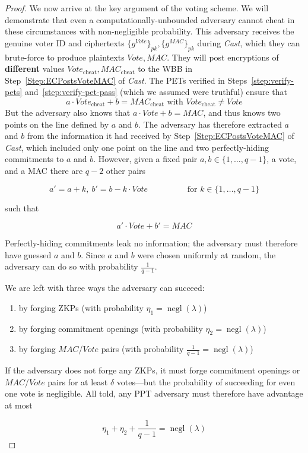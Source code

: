 \documentclass[12pt,a4paper]{article}
\DeclareMathOperator{\negl}{\text{negl}}
\theoremstyle{definition}
\newcommand{\Vote}{\mathit{Vote}}
\newcommand{\Mac}{\mathit{MAC}}
\begin{document}
\begin{proof}
    We now arrive at the key argument of the voting scheme. We will demonstrate that even a computationally-unbounded adversary cannot cheat in these circumstances with non-negligible probability. This adversary receives the genuine voter ID and ciphertexts $\{g^\Vote\}_{pk}, \{g^\Mac\}_{pk}$ during \textit{Cast}, which they can brute-force to produce plaintexts $\Vote, \Mac$. They will post encryptions of \textbf{different} values $\Vote_\text{cheat}, \Mac_\text{cheat}$ to the WBB in Step~\ref{Step:ECPostsVoteMAC} of \textit{Cast}. The PETs verified in Steps~\ref{step:verify-pets} and~\ref{step:verify-pet-pass} (which we assumed were truthful) ensure that
    $$a\cdot\Vote_\text{cheat}+b=\Mac_\text{cheat}\text{ with }\Vote_\text{cheat}\neq\Vote$$
    But the adversary also knows that $a\cdot\Vote+b=\Mac$, and thus knows two points on the line defined by $a$ and $b$. The adversary has therefore extracted $a$ and $b$ from the information it had received by Step~\ref{Step:ECPostsVoteMAC} of \textit{Cast}, which included only one point on the line and two perfectly-hiding commitments to $a$ and $b$. However, given a fixed pair $a,b\in\{1,\ldots,q-1\}$, a vote, and a MAC there are $q-2$ other pairs
    
    $$a'=a+k,\ b'=b-k\cdot Vote \hspace{2cm} \text{for }k\in\{1,\ldots,q-1\}$$

    such that
    
    $$a'\cdot\Vote+b'=\Mac$$
    
    Perfectly-hiding commitments leak no information; the adversary must therefore have guessed $a$ and $b$. Since $a$ and $b$ were chosen uniformly at random, the adversary can do so with probability $\frac{1}{q-1}$.

    We are left with three ways the adversary can succeed:
    \begin{enumerate}
        \item by forging ZKPs (with probability $\eta_1=\negl(\lambda)$)
        \item by forging commitment openings (with probability $\eta_2=\negl(\lambda)$)
        \item by forging $\Mac$/$\Vote$ pairs (with probability $\frac{1}{q-1}=\negl(\lambda)$)
    \end{enumerate}

    If the adversary does not forge any ZKPs, it must forge commitment openings or $\Mac$/$\Vote$ pairs for at least $\delta$ votes---but the probability of succeeding for even one vote is negligible. All told, any PPT adversary must therefore have advantage at most 

    $$\eta_1+\eta_2+\frac{1}{q-1}=\negl(\lambda)$$
\end{proof}
\end{document}
